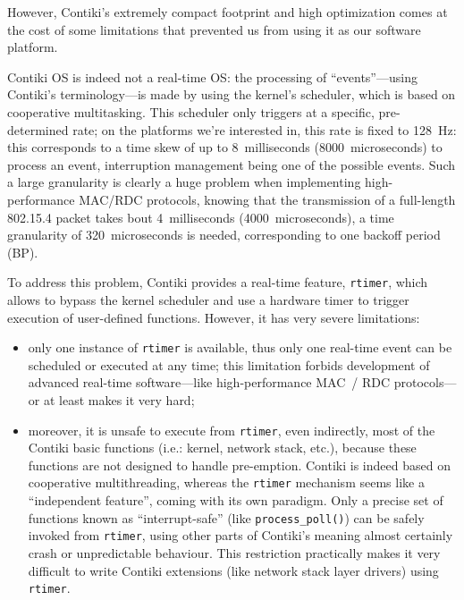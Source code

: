\documentclass[a4paper,twoside]{article}
\begin{document}
However, Contiki's extremely compact footprint and high optimization comes
at the cost of some limitations that prevented us from using it as our
software platform.

Contiki OS is indeed not a real-time OS: the processing of ``events''---using
Contiki's terminology---is made by using the kernel's scheduler, which is
based on cooperative multitasking. This scheduler only triggers at a specific,
pre-determined rate; on the platforms we're interested in, this rate is
fixed to 128~Hz: this corresponds to a time skew of up to 8~milliseconds
(8000~microseconds) to process an event, interruption management being
one of the possible events. Such a large granularity is clearly
a huge problem when implementing high-performance MAC/RDC protocols,
knowing that the transmission of a full-length 802.15.4 packet takes
bout 4~milliseconds (4000~microseconds), a time granularity of
320~microseconds is needed, corresponding to one backoff period (BP).

To address this problem, Contiki provides a real-time feature,
\texttt{rtimer}, which allows to bypass the kernel scheduler and use
a hardware timer to trigger execution of user-defined functions. However,
it has very severe limitations:

\begin{itemize}

\item only one instance of \texttt{rtimer} is available, thus only one
real-time event can be scheduled or executed at any time; this limitation
forbids development of advanced real-time software---like high-performance
MAC~/ RDC protocols---or at least makes it very hard;

\item moreover, it is unsafe to execute from \texttt{rtimer}, even
indirectly, most of the Contiki basic functions (i.e.: kernel, network
stack, etc.), because these functions are not designed to handle pre-emption.
Contiki is indeed based on cooperative multithreading, whereas the
\texttt{rtimer} mechanism seems like a ``independent feature'', coming
with its own paradigm.
Only a precise set of functions known as ``interrupt-safe'' (like
\texttt{process\_poll()}) can be safely invoked from \texttt{rtimer},
using other parts of Contiki's meaning almost certainly crash or
unpredictable behaviour. This restriction practically makes it very
difficult to write Contiki extensions (like network stack layer drivers)
using \texttt{rtimer}.


\end{itemize}
\end{document}
